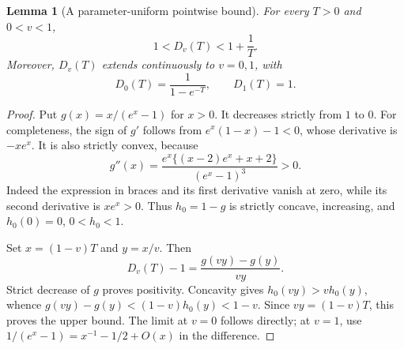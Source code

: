 \documentclass[11pt]{article}
\numberwithin{equation}{section}
\newtheorem{lemma}[theorem]{Lemma}
\theoremstyle{definition}\newtheorem{definition}[theorem]{Definition}
\theoremstyle{remark}\newtheorem{remark}[theorem]{Remark}
\begin{document}
\begin{lemma}[A parameter-uniform pointwise bound]\label{lem:D}
For every $T>0$ and $0<v<1$,
\begin{equation}\label{eq:Dbound}
 1<D_v(T)<1+\frac1T.
\end{equation}
Moreover, $D_v(T)$ extends continuously to $v=0,1$, with
\begin{equation}\label{eq:Dends}
 D_0(T)=\frac1{1-e^{-T}},\qquad D_1(T)=1.
\end{equation}
\end{lemma}
\begin{proof}
Put $g(x)=x/(e^x-1)$ for $x>0$. It decreases strictly from $1$ to $0$.
For completeness, the sign of $g'$ follows from
$e^x(1-x)-1<0$, whose derivative is $-xe^x$.
It is also strictly convex, because
\[
 g''(x)=\frac{e^x\{(x-2)e^x+x+2\}}{(e^x-1)^3}>0.
\]
Indeed the expression in braces and its first derivative vanish at
zero, while its second derivative is $xe^x>0$.
Thus $h_0=1-g$ is strictly concave, increasing, and $h_0(0)=0$,
$0<h_0<1$.

Set $x=(1-v)T$ and $y=x/v$. Then
\[
 D_v(T)-1=\frac{g(vy)-g(y)}{vy}.
\]
Strict decrease of $g$ proves positivity. Concavity gives
$h_0(vy)>v h_0(y)$, whence
$g(vy)-g(y)<(1-v)h_0(y)<1-v$. Since $vy=(1-v)T$,
this proves the upper bound. The limit at $v=0$ follows directly;
at $v=1$, use $1/(e^x-1)=x^{-1}-1/2+O(x)$ in the difference.
\end{proof}
\end{document}
